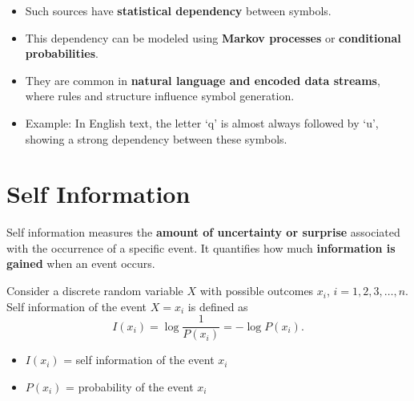 \documentclass[11pt,a4paper]{book}
\newenvironment{definitionbox}[1][Definition]{%
    \begin{tcolorbox}[
        enhanced,
        breakable,
        colback=primaryblue!10,
        colframe=primaryblue!150,
        title=#1,
        fonttitle=\bfseries,
        sharp corners,
        boxrule=0.8pt,
        left=8pt,
        right=8pt,
        top=6pt,
        bottom=6pt
    ]
}{\end{tcolorbox}}
\newenvironment{formulabox}[1][Formula]{%
    \begin{tcolorbox}[
        enhanced,
        breakable,
        colback=softcoral!10,
        colframe=softcoral!200,
        title=#1,
        fonttitle=\bfseries,
        coltitle=white,
        sharp corners,
        boxrule=1pt,
        left=8pt,
        right=8pt,
        top=6pt,
        bottom=6pt
    ]
}{\end{tcolorbox}}
\begin{document}
\begin{itemize}
    \item Such sources have \textbf{statistical dependency} between symbols.
    \item This dependency can be modeled using \textbf{Markov processes} or \textbf{conditional probabilities}.
    \item They are common in \textbf{natural language and encoded data streams}, where rules and structure influence symbol generation.
    \item Example: In English text, the letter `q' is almost always followed by `u', showing a strong dependency between these symbols.
\end{itemize}
\clearpage

\section{Self Information}

\begin{definitionbox}[Self Information]
Self information measures the \textbf{amount of uncertainty or surprise} associated with the occurrence of a specific event. It quantifies how much \textbf{information is gained} when an event occurs.
\end{definitionbox}

\begin{formulabox}[Self Information Formula]
Consider a discrete random variable $X$ with possible outcomes $x_i$, $i = 1, 2, 3, \dots, n$. Self information of the event $X = x_i$ is defined as
\[
I(x_i) = \log \frac{1}{P(x_i)} = -\log P(x_i).
\]
\begin{itemize}
    \item $I(x_i)$ = self information of the event $x_i$
    \item $P(x_i)$ = probability of the event $x_i$
\end{itemize}
\end{formulabox}
\end{document}
